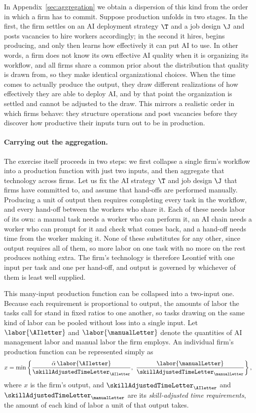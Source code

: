 In Appendix~\ref{sec:aggregation} we obtain a dispersion of this kind from the order in which a firm has to commit.
Suppose production unfolds in two stages.
In the first, the firm settles on an AI deployment strategy $\T$ and a job design $\J$ and posts vacancies to hire workers accordingly; in the second it hires, begins producing, and only then learns how effectively it can put AI to use.
In other words, a firm does not know its own effective AI quality when it is organizing its workflow, and all firms share a common prior about the distribution that quality is drawn from, so they make identical organizational choices.
When the time comes to actually produce the output, they draw different realizations of how effectively they are able to deploy AI, and by that point the organization is settled and cannot be adjusted to the draw.
This mirrors a realistic order in which firms behave: they structure operations and post vacancies before they discover how productive their inputs turn out to be in production.

\paragraph{Carrying out the aggregation.}
The exercise itself proceeds in two steps: we first collapse a single firm's workflow into a production function with just two inputs, and then aggregate that technology across firms.
Let us fix the AI strategy $\T$ and job design $\J$ that firms have committed to, and assume that hand-offs are performed manually.
Producing a unit of output then requires completing every task in the workflow, and every hand-off between the workers who share it.
Each of these needs labor of its own: a manual task needs a worker who can perform it, an AI chain needs a worker who can prompt for it and check what comes back, and a hand-off needs time from the worker making it.
None of these substitutes for any other, since output requires all of them, so more labor on one task with no more on the rest produces nothing extra.
The firm's technology is therefore Leontief with one input per task and one per hand-off, and output is governed by whichever of them is least well supplied.

This many-input production function can be collapsed into a two-input one.
Because each requirement is proportional to output, the amounts of labor the tasks call for stand in fixed ratios to one another, so tasks drawing on the same kind of labor can be pooled without loss into a single input.
Let $\labor{\AIletter}$ and $\labor{\manualLetter}$ denote the quantities of AI management labor and manual labor the firm employs.
An individual firm's production function can be represented simply as
\begin{align}
\label{eq:lr_micro_prod}
x = \min\left\{ \frac{\bar{\alpha}\,\labor{\AIletter}}{\skillAdjustedTimeLetter_{\AIletter}}, \ \frac{\labor{\manualLetter}}{\skillAdjustedTimeLetter_{\manualLetter}} \right\},
\end{align}
where $x$ is the firm's output, and $\skillAdjustedTimeLetter_{\AIletter}$ and $\skillAdjustedTimeLetter_{\manualLetter}$ are its \emph{skill-adjusted time requirements}, the amount of each kind of labor a unit of that output takes.

